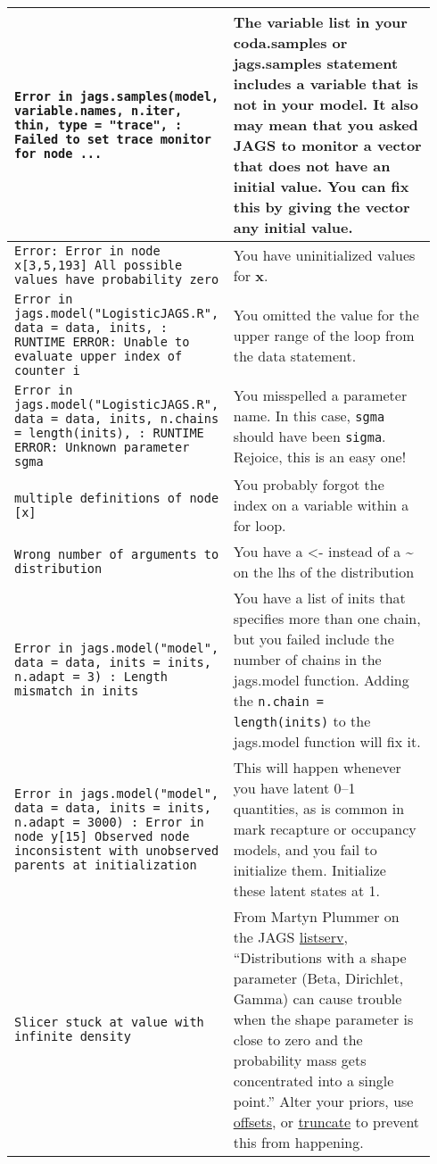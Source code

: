 \documentclass[12pt,english]{article}
\begin{document}
{\begin{center}
\begin{longtable}{|p{0.46\linewidth}|p{0.48\linewidth}|}
\hline 
\texttt{Error in jags.samples(model, variable.names, n.iter, thin, type = "trace", : Failed to set trace monitor for node ...}& The variable list in your coda.samples or jags.samples statement includes a variable that is not in your model. It also may mean that you asked JAGS to monitor a vector that does not have an initial value. You can fix this by giving the vector any initial value.\\
\hline 
\texttt{Error: Error in node x[3,5,193] All possible values have probability zero} & You have uninitialized values for \textbf{x}.\\
\hline 
\texttt{Error in jags.model("LogisticJAGS.R", data = data, inits, : RUNTIME ERROR: Unable to evaluate upper index of counter i} & You omitted the value for the upper range of the loop from the data statement.\\
\hline 
\texttt{Error in jags.model("LogisticJAGS.R", data = data, inits, n.chains = length(inits), : RUNTIME ERROR: Unknown parameter sgma} & You misspelled a parameter name. In this case, \texttt{sgma} should have been \texttt{sigma}. Rejoice, this is an easy one!\\
\hline 
\texttt{multiple definitions of node [x]} & You probably forgot the index on a variable within a for loop.\\
\hline 
\texttt{Wrong number of arguments to distribution} & You have a <- instead of a \textasciitilde{} on the lhs of the distribution\\
\hline 
\texttt{Error in jags.model("model", data = data, inits = inits, n.adapt = 3) : Length mismatch in inits} & You have a list of inits that specifies more than one chain, but you failed include the number of chains in the jags.model function. Adding the \texttt{n.chain = length(inits)} to the jags.model function will fix it.\\
\hline 
\texttt{Error in jags.model("model", data = data, inits = inits, n.adapt = 3000) : Error in node y[15] Observed node inconsistent with unobserved parents at initialization} & This will happen whenever you have latent 0--1 quantities, as is common in mark recapture or occupancy models, and you fail to initialize them. Initialize these latent states at 1.\\
\hline 
\texttt{Slicer stuck at value with infinite density} & From Martyn Plummer on the JAGS \href{https://sourceforge.net/p/mcmc-jags/discussion/610037/thread/c21ef62a/}{listserv}, \enquote{Distributions with a shape parameter (Beta, Dirichlet, Gamma) can cause trouble when the shape parameter is close to zero and the probability mass gets concentrated into a single point.} Alter your priors, use \href{https://sourceforge.net/p/mcmc-jags/discussion/610037/thread/c21ef62a/}{offsets}, or \href{https://sourceforge.net/p/mcmc-jags/discussion/610037/thread/8cf14eb0/}{truncate} to prevent this from happening.\\

\end{longtable}
\end{center}}
\end{document}
